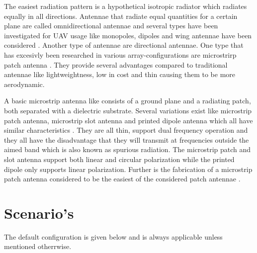 \documentclass[twocolumn]{phdsymp} %
\begin{document}
The easiest radiation pattern is a hypothetical isotropic radiator which radiates equally in all directions.
Antennae that radiate equal quantities for a certain plane  are called omnidirectional antennae \cite{U12} and several types 
have been investigated for \gls{UAV} usage like monopoles, dipoles and wing antennae 
have been considered \cite{A4,A10,A11,A12}.
Another type of antennae are directional antennae. One type 
that has excesivly been researched in various array-configurations are microstrirp patch antenna \cite{A5,A6,A8}.
They provide several advantages compared to traditional antennae \cite{J13_microstripadvantages, J14_antennadesign}
like lightweightness, low in cost and thin causing them to be more aerodynamic. 

A basic microstrip antenna like consists of a ground plane and
a radiating patch, both separated with a dielectric substrate. 
Several variations exist like microstrip patch antenna, microstrip slot antenna and printed dipole antenna which
all have similar characteristics \cite{J13_microstripadvantages, J14_antennadesign}. They are all thin, support dual frequency operation and they all have the disadvantage that they 
will transmit at frequencies outside the aimed band which is also known as
spurious radiation. The microstrip patch and slot antenna support both linear
and circular polarization while the printed dipole only supports linear polarization. Further is the fabrication of a microstrip patch antenna considered to be the easiest of the considered patch antennae \cite{J13_microstripadvantages}. 


\section{Scenario's}

The default configuration is given below and is always applicable unless mentioned otherrwise. 
\end{document}
